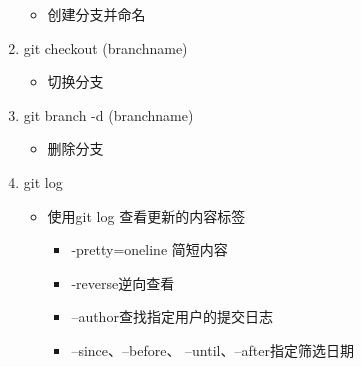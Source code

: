 \documentclass[a4paper, 12pt]{article}
\begin{document}
\begin{enumerate}
\begin{itemize}
      \item 创建分支并命名
    \end{itemize}
  \item {\large git checkout (branchname)}
    \begin{itemize}
      \item 切换分支
    \end{itemize}
  \item{\large git branch -d (branchname)}
    \begin{itemize}
      \item 删除分支
    \end{itemize}
  \item{\large git log}
    \begin{itemize}
      \item 使用git log 查看更新的内容标签
        \begin{itemize}
          \item -pretty=oneline 简短内容
          \item -reverse逆向查看
          \item –author查找指定用户的提交日志
          \item –since、–before、 --until、–after指定筛选日期
        \end{itemize}
    \end{itemize}
\end{enumerate}
\end{document}

